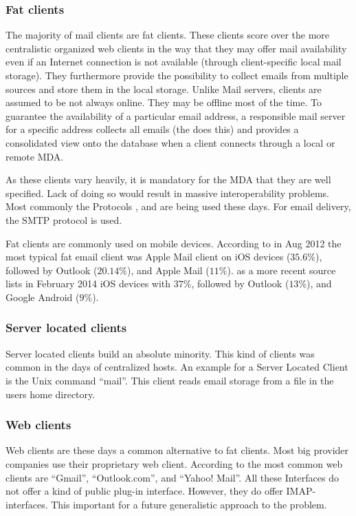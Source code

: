 \subsubsection{Fat clients}
The majority of mail clients are fat clients. These clients score over the more centralistic organized web clients in the way that they may offer mail availability even if an Internet connection is not available (through client-specific local mail storage). They furthermore provide the possibility to collect emails from multiple sources and store them in the local storage. Unlike Mail servers, clients are assumed to be not always online. They may be offline most of the time. To guarantee the availability of a particular email address, a responsible mail server for a specific address collects all emails (the  does this) and provides a consolidated view onto the database when a client connects through a local or remote MDA.

As these clients vary heavily, it is mandatory for the MDA that they are well specified. Lack of doing so would result in massive interoperability problems. Most commonly the Protocols ,  and  are being used these days. For email delivery, the SMTP protocol is used. 

Fat clients are commonly used on mobile devices. According to  \cite{clientDistribution} in Aug 2012 the most typical fat email client was Apple Mail client on iOS devices ($35.6\%$), followed by Outlook ($20.14\%$), and Apple Mail ($11\%$). \cite{clientDistribution2} as a more recent source lists in February 2014 iOS devices with $37\%$, followed by Outlook ($13\%$), and  Google Android ($9\%$).

\subsubsection{Server located clients}
Server located clients build an absolute minority. This kind of clients was common in the days of centralized hosts. An example for a Server Located Client is the Unix command ``mail''. This client reads email storage from a file in the users home directory.

\subsubsection{Web clients}
Web clients are these days a common alternative to fat clients. Most big provider companies use their proprietary web client. According to \cite{clientDistribution2} the most common web clients are "`Gmail"', "`Outlook.com"', and "`Yahoo! Mail"'. All these Interfaces do not offer a kind of public plug-in interface. However,  they do offer IMAP-interfaces. This important for a future generalistic approach to the problem.

